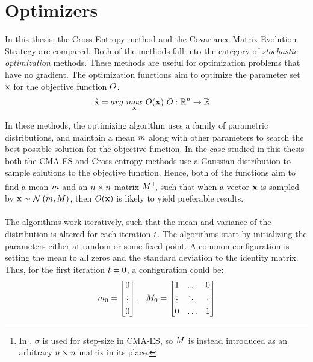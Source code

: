 \section{Optimizers \label{Optimizers}}

In this thesis, the Cross-Entropy method and the Covariance Matrix Evolution 
Strategy are compared. Both of the methods fall into the category of 
\textit{stochastic optimization}
methods. These methods are useful for 
optimization problems that have no gradient.
The optimization functions aim to optimize 
the parameter set $\textbf{x}$
for the objective function $O$.
\begin{align*}
\hat{\textbf{\individual }} &= 
arg \  \underset{\textbf{\individual }}{max} \  
\fitnessFunction (\textbf{\individual }) \ 
\fitnessFunction : \mathbb{R}^{\dimensions } \rightarrow \mathbb{R}
\end{align*}

In these methods, the optimizing algorithm uses a family of parametric distributions,
and maintain a mean $m $ along with other parameters
to search the best possible solution for the objective function.  
In the case studied in this thesis
both the CMA-ES and Cross-entropy methods use a 
Gaussian distribution to sample solutions to the objective function.
Hence, both of the functions aim to find a mean 
$m $ and an $n \times n$ matrix 
$M $\footnote{In \citep{hansen2011}, 
$\sigma$ is used for step-size in CMA-ES, so $M $ is instead introduced
as an arbitrary $n \times n$ matrix in its place.}, such that when
a vector $\textbf{x}$ is sampled by 
$\textbf{x} \sim \mathcal{N}\left( m, M \right)$, 
then $O (\textbf{x})$ 
is likely to yield preferable results.\\
\\
The algorithms work iteratively, such that the mean and variance 
of the distribution 
is altered for each iteration $t $.
The algorithms start by initializing the 
parameters either at random or some fixed point. A common 
configuration is setting the mean to 
all zeros and the standard deviation to the identity matrix.
Thus, for the first iteration $t = 0$, a configuration could be:
\begin{align*}
\mean_{0} =
\begin{bmatrix}
0\\
\vdots\\
0
\end{bmatrix},\ \ 
\varianceMatrix _{0} = 
\begin{bmatrix}
1 & \hdots & 0\\
\vdots & \ddots & \vdots\\
0 & \hdots & 1
\end{bmatrix}
\end{align*}

